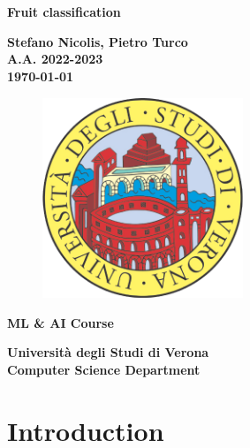 \documentclass[12pt]{article}
\title{}
\author{Stefano Nicolis}
\begin{document}
\begin{titlepage}
   \begin{center}
       \vspace*{1cm}
 
	\large
      {\huge \textbf{Fruit classification} }
 
       \vspace{1.5cm}
 
       \textbf{Stefano Nicolis, Pietro Turco}\\
	\textbf{A.A. 2022-2023}\\
	\vspace{0.35cm}
	\textbf{\today}

\vfill
\begin{figure}[h!]
	\begin{center}
	  \includegraphics[height=6cm, width=6cm]{media/logounivr}
	\end{center}
\end{figure}
 
	\vfill
 	\textbf{ML \& AI Course\\}
 
       \vspace{3cm}
 
      \begin{multicols}{2}
      \textbf{Università degli Studi di Verona\\
	 Computer Science Department}
	\end{multicols}
 
   \end{center}
\end{titlepage}


\tableofcontents

\clearpage
\section{Introduction}

\end{document}

